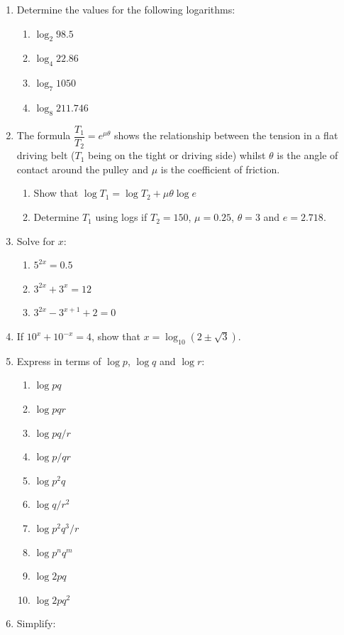 \documentclass[
  12pt,
  oneside]{book}
\providecommand{\tightlist}{%
  \setlength{\itemsep}{0pt}\setlength{\parskip}{0pt}}
\theoremstyle{definition}
\theoremstyle{definition}
\theoremstyle{definition}
\theoremstyle{definition}
\theoremstyle{remark}
\begin{document}
\begin{enumerate}
\def\labelenumi{\arabic{enumi}.}
\item
  Determine the values for the following logarithms:

  \begin{enumerate}
  \def\labelenumii{\roman{enumii})}
  \tightlist
  \item
    \(\log_2 98.5\)
  \item
    \(\log_4 22.86\)
  \item
    \(\log_7 1050\)
  \item
    \(\log_8 211.746\)
  \end{enumerate}
\item
  The formula \(\dfrac{T_1}{T_2}=e^{\mu\theta}\) shows the relationship between the tension in a flat driving belt (\(T_1\) being on the tight or driving side) whilst \(\theta\) is the angle of contact around the pulley and \(\mu\) is the coefficient of friction.

  \begin{enumerate}
  \def\labelenumii{\roman{enumii})}
  \tightlist
  \item
    Show that \(\log T_1 = \log T_2 + \mu\theta\log e\)
  \item
    Determine \(T_1\) using logs if \(T_2=150\), \(\mu=0.25\), \(\theta=3\) and \(e=2.718\).
  \end{enumerate}
\item
  Solve for \(x\):

  \begin{enumerate}
  \def\labelenumii{\roman{enumii})}
  \tightlist
  \item
    \(5^{2x}=0.5\)
  \item
    \(3^{2x}+3^x=12\)
  \item
    \(3^{2x}-3^{x+1}+2=0\)
  \end{enumerate}
\item
  If \(10^x+10^{-x}=4\), show that \(x=\log_{10}(2\pm\sqrt{3})\).
\item
  Express in terms of \(\log p\), \(\log q\) and \(\log r\):

  \begin{enumerate}
  \def\labelenumii{\alph{enumii})}
  \tightlist
  \item
    \(\log pq\)
  \item
    \(\log pqr\)
  \item
    \(\log pq/r\)
  \item
    \(\log p/qr\)
  \item
    \(\log p^2q\)
  \item
    \(\log q/r^2\)
  \item
    \(\log p^2q^3/r\)
  \item
    \(\log p^nq^m\)
  \item
    \(\log 2pq\)
  \item
    \(\log 2pq^2\)
  \end{enumerate}
\item
  Simplify:


\end{enumerate}
\end{document}
